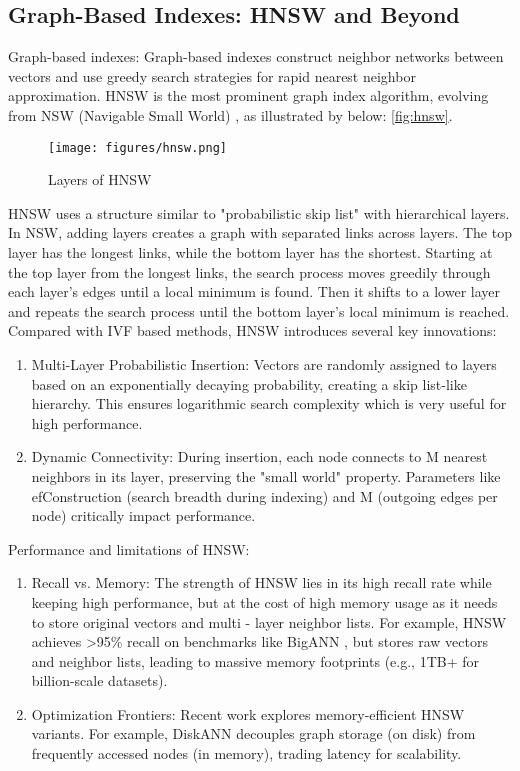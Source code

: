 \documentclass[sigconf, nonacm]{acmart}
\begin{document}
\subsection{Graph-Based Indexes: HNSW and Beyond}

Graph-based indexes: Graph-based indexes construct neighbor networks between vectors and use greedy search strategies for rapid nearest neighbor approximation. HNSW \cite{malkov2018efficient} is the most prominent graph index algorithm, evolving from NSW (Navigable Small World) \cite{malkov2014approximate}, as illustrated by below: \autoref{fig:hnsw}.

\begin{figure}
  \centering
  \texttt{[image: figures/hnsw.png]}
  \caption{Layers of HNSW}
  \label{fig:hnsw}
\end{figure}
HNSW uses a structure similar to "probabilistic skip list" with hierarchical layers. In NSW, adding layers creates a graph with separated links across layers. The top layer has the longest links, while the bottom layer has the shortest. Starting at the top layer from the longest links, the search process moves greedily through each layer's edges until a local minimum is found. Then it shifts to a lower layer and repeats the search process until the bottom layer's local minimum is reached. 
Compared with IVF based methods, HNSW introduces several key innovations:
\begin{enumerate}
    \item  Multi-Layer Probabilistic Insertion: Vectors are randomly assigned to layers based on an exponentially decaying probability, creating a skip list-like hierarchy. This ensures logarithmic search complexity which is very useful for high performance.
    \item Dynamic Connectivity: During insertion, each node connects to M nearest neighbors in its layer, preserving the "small world" property. Parameters like efConstruction (search breadth during indexing) and M (outgoing edges per node) critically impact performance.
\end{enumerate}

Performance and limitations of HNSW:

\begin{enumerate}
    \item Recall vs. Memory: The strength of HNSW lies in its high recall rate while keeping high performance, but at the cost of high memory usage as it needs to store original vectors and multi - layer neighbor lists. For example, HNSW achieves >95\% recall on benchmarks like BigANN \cite{bigann}, but stores raw vectors and neighbor lists, leading to massive memory footprints (e.g., 1TB+ for billion-scale datasets).
    \item Optimization Frontiers: Recent work explores memory-efficient HNSW variants. For example, DiskANN\cite{jayaram2019diskann} decouples graph storage (on disk) from frequently accessed nodes (in memory), trading latency for scalability. 
\end{enumerate}
\end{document}
